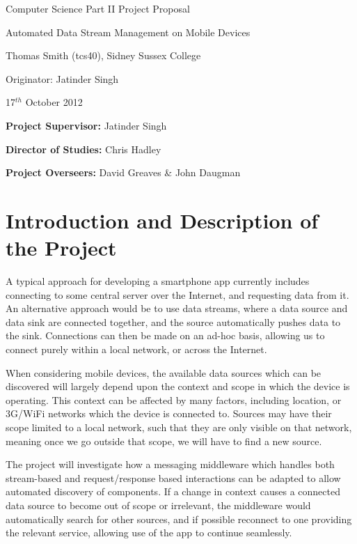 \vfil

\centerline{\Large Computer Science Part II Project Proposal }
\vspace{0.4in}
\centerline{\Large Automated Data Stream Management on Mobile Devices }
\vspace{0.4in}
\centerline{\large Thomas Smith (tcs40), Sidney Sussex College}
\vspace{0.3in}
\centerline{\large Originator: Jatinder Singh}
\vspace{0.3in}
\centerline{\large 17$^{th}$ October 2012}

\vfil


\noindent
{\bf Project Supervisor:} Jatinder Singh
\vspace{0.2in}

\noindent
{\bf Director of Studies:} Chris Hadley
\vspace{0.2in}
\noindent

\noindent
{\bf Project Overseers:} David Greaves  \& John Daugman



\section*{Introduction and Description of the Project}

A typical approach for developing a smartphone app currently includes connecting to some central server over the Internet, and requesting data from it. An alternative approach would be to use data streams, where a data source and data sink are connected together, and the source automatically pushes data to the sink. Connections can then be made on an ad-hoc basis, allowing us to connect purely within a local network, or across the Internet.

When considering mobile devices, the available data sources which can be discovered will largely depend upon the context and scope in which the device is operating. This context can be affected by many factors, including location, or 3G/WiFi networks which the device is connected to. Sources may have their scope limited to a local network, such that they are only visible on that network, meaning once we go outside that scope, we will have to find a new source.

The project will investigate how a messaging middleware which handles both stream-based and request/response based interactions can be adapted to allow automated discovery of components. If a change in context causes a connected data source to become out of scope or irrelevant, the middleware would automatically search for other sources, and if possible reconnect to one providing the relevant service, allowing use of the app to continue seamlessly.

